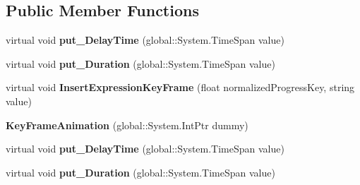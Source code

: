 \subsection*{Public Member Functions}
\begin{DoxyCompactItemize}
\item 
\mbox{\label{class_windows_1_1_u_i_1_1_composition_1_1_key_frame_animation_ac62b6652265be62aec74788b234c8dc5}} 
virtual void {\bfseries put\+\_\+\+Delay\+Time} (global\+::\+System.\+Time\+Span value)
\item 
\mbox{\label{class_windows_1_1_u_i_1_1_composition_1_1_key_frame_animation_ac8c63cee562c78b3993f3c3b6ceae431}} 
virtual void {\bfseries put\+\_\+\+Duration} (global\+::\+System.\+Time\+Span value)
\item 
\mbox{\label{class_windows_1_1_u_i_1_1_composition_1_1_key_frame_animation_aa9ca1cc7ef8fee48aa80be58f822d74d}} 
virtual void {\bfseries Insert\+Expression\+Key\+Frame} (float normalized\+Progress\+Key, string value)
\item 
\mbox{\label{class_windows_1_1_u_i_1_1_composition_1_1_key_frame_animation_a41ceaa7dc6978478da5356996171bca7}} 
{\bfseries Key\+Frame\+Animation} (global\+::\+System.\+Int\+Ptr dummy)
\item 
\mbox{\label{class_windows_1_1_u_i_1_1_composition_1_1_key_frame_animation_ac62b6652265be62aec74788b234c8dc5}} 
virtual void {\bfseries put\+\_\+\+Delay\+Time} (global\+::\+System.\+Time\+Span value)
\item 
\mbox{\label{class_windows_1_1_u_i_1_1_composition_1_1_key_frame_animation_ac8c63cee562c78b3993f3c3b6ceae431}} 
virtual void {\bfseries put\+\_\+\+Duration} (global\+::\+System.\+Time\+Span value)
\item 
\mbox{\label{class_windows_1_1_u_i_1_1_composition_1_1_key_frame_animation_aa9ca1cc7ef8fee48aa80be58f822d74d}} 

\end{DoxyCompactItemize}
